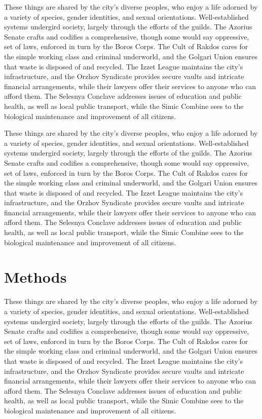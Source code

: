 These things are shared by the city's diverse peoples, who enjoy a life adorned
by a variety of  species, gender identities, and sexual orientations.
Well-established systems undergird society, largely through the efforts of the
guilds. The Azorius Senate crafts and codifies a comprehensive, though some
would say oppressive, set of laws, enforced in turn by the Boros Corps. The Cult
of Rakdos cares for the simple working class and criminal underworld, and the
Golgari Union ensures that waste is disposed of and recycled. The Izzet League
maintains the city's infrastructure, and the Orzhov Syndicate provides secure
vaults and intricate financial arrangements, while their lawyers offer their
services to anyone who can afford them. The Selesnya Conclave addresses issues
of education and public health, as well as local public transport, while the
Simic Combine sees to the biological maintenance and improvement of all
citizens.

These things are shared by the city's diverse peoples, who enjoy a life adorned
by a variety of  species, gender identities, and sexual orientations.
Well-established systems undergird society, largely through the efforts of the
guilds. The Azorius Senate crafts and codifies a comprehensive, though some
would say oppressive, set of laws, enforced in turn by the Boros Corps. The Cult
of Rakdos cares for the simple working class and criminal underworld, and the
Golgari Union ensures that waste is disposed of and recycled. The Izzet League
maintains the city's infrastructure, and the Orzhov Syndicate provides secure
vaults and intricate financial arrangements, while their lawyers offer their
services to anyone who can afford them. The Selesnya Conclave addresses issues
of education and public health, as well as local public transport, while the
Simic Combine sees to the biological maintenance and improvement of all
citizens.

\chapter{Methods}
These things are shared by the city's diverse peoples, who enjoy a life adorned
by a variety of  species, gender identities, and sexual orientations.
Well-established systems undergird society, largely through the efforts of the
guilds. The Azorius Senate crafts and codifies a comprehensive, though some
would say oppressive, set of laws, enforced in turn by the Boros Corps. The Cult
of Rakdos cares for the simple working class and criminal underworld, and the
Golgari Union ensures that waste is disposed of and recycled. The Izzet League
maintains the city's infrastructure, and the Orzhov Syndicate provides secure
vaults and intricate financial arrangements, while their lawyers offer their
services to anyone who can afford them. The Selesnya Conclave addresses issues
of education and public health, as well as local public transport, while the
Simic Combine sees to the biological maintenance and improvement of all
citizens. 

